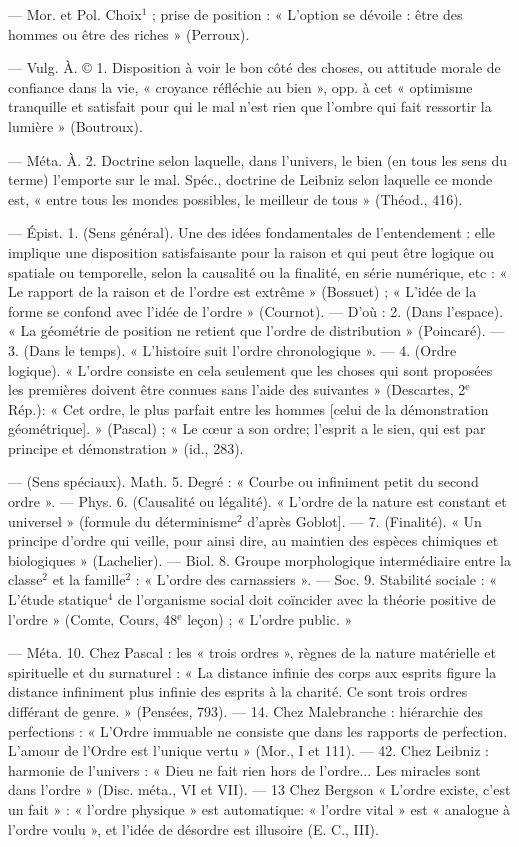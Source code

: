 \begin{itemize}[leftmargin=1cm, label=, itemsep=1pt]
 — Mor. et Pol. Choix$^1$ ; prise
de position : « L'option se dévoile :
être des hommes ou être des riches »
(Perroux).

 — Vulg. À. © 1. Disposition
à voir le bon côté des choses, ou
attitude morale de confiance dans
la vie, « croyance réfléchie au bien »,
opp. à cet « optimisme tranquille et
satisfait pour qui le mal n’est rien
que l'ombre qui fait ressortir la
lumière » (Boutroux).

— Méta. À. 2. Doctrine selon
laquelle, dans l'univers, le bien (en
tous les sens du terme) l’emporte
sur le mal. Spéc., doctrine de Leibniz
selon laquelle ce monde est, « entre
tous les mondes possibles, le meilleur de tous » (Théod., 416).

 — Épist. 1. (Sens général). Une
des idées fondamentales de l’entendement : elle implique une disposition satisfaisante pour la raison et
qui peut être logique ou spatiale ou
temporelle, selon la causalité ou la
finalité, en série numérique, etc :
« Le rapport de la raison et de l’ordre
est extrême » (Bossuet) ; « L'idée de la
forme se confond avec l'idée de
l’ordre » (Cournot). — D'où : 2.
(Dans l’espace). « La géométrie de
position ne retient que l’ordre de
distribution » (Poincaré). — 3. (Dans
le temps). « L'histoire suit l’ordre
chronologique ». — 4. (Ordre logique). « L'ordre consiste en cela
seulement que les choses qui sont
proposées les premières doivent être
connues sans l’aide des suivantes »
(Descartes, 2$^\text{e}$ Rép.): « Cet ordre, le
plus parfait entre les hommes [celui
de la démonstration géométrique]. »
(Pascal) ; « Le cœur a son ordre;
l'esprit a le sien, qui est par principe et démonstration » (id., 283).

— (Sens spéciaux). Math. 5. Degré : « Courbe ou infiniment petit du
second ordre ». — Phys. 6. (Causalité ou légalité). « L'ordre de la
nature est constant et universel »
(formule du déterminisme$^2$ d’après
Goblot]. — 7. (Finalité). « Un principe d'ordre qui veille, pour ainsi
dire, au maintien des espèces chimiques et biologiques » (Lachelier).
— Biol. 8. Groupe morphologique
intermédiaire entre la classe$^2$ et la
famille$^2$ : « L'ordre des carnassiers ».
— Soc. 9. Stabilité sociale : « L'étude
statique$^4$ de l’organisme social doit
coïncider avec la théorie positive de
l'ordre » (Comte, Cours, 48$^\text{e}$ leçon) ;
« L'ordre public. »

— Méta. 10. Chez Pascal : les
« trois ordres », règnes de la nature
matérielle et spirituelle et du surnaturel : « La distance infinie des
corps aux esprits figure la distance
infiniment plus infinie des esprits
à la charité. Ce sont trois ordres
différant de genre. » (Pensées, 793).
— 14. Chez Malebranche : hiérarchie des perfections : « L'Ordre
immuable ne consiste que dans les
rapports de perfection. L'amour de
l'Ordre est l'unique vertu » (Mor., I
et 111). — 42. Chez Leibniz : harmonie de l'univers : « Dieu ne fait
rien hors de l’ordre... Les miracles
sont dans l’ordre » (Disc. méta., VI
et VII). — 13 Chez Bergson
« L'ordre existe, c'est un fait » :
« l’ordre physique » est automatique:
« l'ordre vital » est « analogue à
l’ordre voulu », et l’idée de désordre
est illusoire (E. C., III).


\end{itemize}
